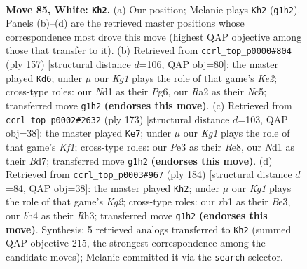 \documentclass[11pt]{article}
\begin{document}
\clearpage

\begin{figure}[p]\centering
\begin{subfigure}{0.46\textwidth}\centering
\resizebox{\linewidth}{!}{%
\newchessgame
\chessboard[
  setfen={8/6k1/8/P1p2p2/3p1Ppb/4P1n1/R1QB4/1r1N1qK1 w - - 13 85},
  showmover=false,
  pgfstyle=straightmove, color=movearrow, markmove={g1-h2}
]}
\caption{}
\end{subfigure}\hfill
\begin{subfigure}{0.46\textwidth}\centering
\resizebox{\linewidth}{!}{%
\newchessgame
\chessboard[
  setfen={4Q3/4k3/5Np1/2np1qP1/4p2P/8/5PK1/8 b - - 1 79},
  showmover=false,
  pgfstyle=straightmove, color=movearrow, markmove={e7-d6}
]}
\caption{}
\end{subfigure}
\\[4pt]
\begin{subfigure}{0.46\textwidth}\centering
\resizebox{\linewidth}{!}{%
\newchessgame
\chessboard[
  setfen={4rk2/p2b1p2/P2qp2Q/7N/2pP3P/2P2PP1/6K1/8 b - - 6 87},
  showmover=false,
  pgfstyle=straightmove, color=movearrow, markmove={f8-e7}
]}
\caption{}
\end{subfigure}\hfill
\begin{subfigure}{0.46\textwidth}\centering
\resizebox{\linewidth}{!}{%
\newchessgame
\chessboard[
  setfen={1r6/8/kp1Qp3/3pP1P1/p1p2Pq1/P1n1B2R/6K1/8 w - - 12 93},
  showmover=false,
  pgfstyle=straightmove, color=movearrow, markmove={g2-h2}
]}
\caption{}
\end{subfigure}
\caption{\textbf{Move 85, White: \texttt{Kh2}.} (a) Our position; Melanie plays \texttt{Kh2} (\texttt{g1h2}). Panels (b)--(d) are the retrieved master positions whose correspondence most drove this move (highest QAP objective among those that transfer to it). (b) Retrieved from \texttt{ccrl\_top\_p0000\#804} (ply 157) [structural distance $d$=106, QAP obj=80]: the master played \texttt{Kd6}; under $\mu$ our \emph{Kg1} plays the role of that game's \emph{Ke2}; cross-type roles: our \emph{N}d1 as their \emph{P}g6, our \emph{R}a2 as their \emph{N}c5; transferred move \texttt{g1h2} \textbf{(endorses this move)}. (c) Retrieved from \texttt{ccrl\_top\_p0002\#2632} (ply 173) [structural distance $d$=103, QAP obj=38]: the master played \texttt{Ke7}; under $\mu$ our \emph{Kg1} plays the role of that game's \emph{Kf1}; cross-type roles: our \emph{P}e3 as their \emph{R}e8, our \emph{N}d1 as their \emph{B}d7; transferred move \texttt{g1h2} \textbf{(endorses this move)}. (d) Retrieved from \texttt{ccrl\_top\_p0003\#967} (ply 184) [structural distance $d$=84, QAP obj=38]: the master played \texttt{Kh2}; under $\mu$ our \emph{Kg1} plays the role of that game's \emph{Kg2}; cross-type roles: our \emph{r}b1 as their \emph{B}e3, our \emph{b}h4 as their \emph{R}h3; transferred move \texttt{g1h2} \textbf{(endorses this move)}. Synthesis: 5 retrieved analogs transferred to \texttt{Kh2} (summed QAP objective 215, the strongest correspondence among the candidate moves); Melanie committed it via the \texttt{search} selector.}
\label{fig:thought-m168}
\end{figure}
\end{document}
